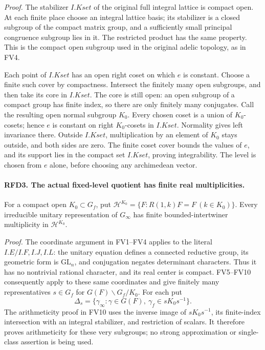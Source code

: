 \documentclass[11pt,a4paper]{article}
\numberwithin{equation}{section}
\theoremstyle{remark}\newtheorem{remark}[theorem]{Remark}
\begin{document}
\emph{Proof.}
The stabilizer \(I.Kset\) of the original full integral lattice is
compact open.  At each finite place choose an integral lattice basis;
its stabilizer is a closed subgroup of the compact matrix group,
and a sufficiently small principal congruence subgroup lies in it.
The restricted product has the same property.  This is the compact
open subgroup used in the original adelic topology, as in FV4.

Each point of \(I.Kset\) has an open right coset on which \(e\)
is constant.  Choose a finite such cover by compactness.  Intersect
the finitely many open subgroups, and then take its core in
\(I.Kset\).  The core is still open: an open subgroup of a compact
group has finite index, so there are only finitely many conjugates.
Call the resulting open normal subgroup \(K_0\).  Every chosen
coset is a union of \(K_0\)-cosets; hence \(e\) is constant on
right \(K_0\)-cosets in \(I.Kset\).  Normality gives left
invariance there.  Outside \(I.Kset\), multiplication by an element
of \(K_0\) stays outside, and both sides are zero.  The finite
coset cover bounds the values of \(e\), and its support lies in
the compact set \(I.Kset\), proving integrability.  The level is
chosen from \(e\) alone, before choosing any archimedean vector.

\paragraph{RFD3. The actual fixed-level quotient has finite real multiplicities.}
\label{claim:RFD3}
For a compact open \(K_0\subset G_f\), put
\(\mathcal H^{K_0}=\{F:R(1,k)F=F\ (k\in K_0)\}\).
Every irreducible unitary representation of \(G_\infty\) has
finite bounded-intertwiner multiplicity in \(\mathcal H^{K_0}\).

\emph{Proof.}
The coordinate argument in FV1--FV4 applies to the literal
\(I.E/I.F,I.J,I.L\): the unitary equation defines a connected
reductive group, its geometric form is \(\mathrm{GL}_n\),
and conjugation negates determinant characters.  Thus it has no
nontrivial rational character, and its real center is compact.
FV5--FV10 consequently apply to these same coordinates and give
finitely many representatives \(s\in G_f\) for
\(G(F)\backslash G_f/K_0\).  For each put
\[
 \Delta_s=\{\gamma_\infty:\gamma\in G(F),\
                         \gamma_f\in sK_0s^{-1}\}.
 \tag{RFD.4}
\]
The arithmeticity proof in FV10 uses the inverse image of
\(sK_0s^{-1}\), its finite-index intersection with an integral
stabilizer, and restriction of scalars.  It therefore proves
arithmeticity for these very subgroups; no strong approximation
or single-class assertion is being used.
\end{document}
